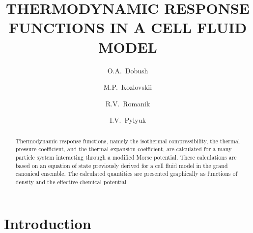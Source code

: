 \documentclass[fleqn,twoside,twocolumn,nofootinbib,showkeys]{revtex4} %
\begin{document}
	\title[Thermodynamic response functions in a cell fluid model]%
	{THERMODYNAMIC RESPONSE FUNCTIONS IN A CELL FLUID MODEL}%
	\author{O.A.~Dobush}%
	\author{M.P.~Kozlovskii}
	\author{R.V.~Romanik}
	\author{I.V.~Pylyuk}
	\address{1, Svientsitskii Str., Lviv 79011, Ukraine}%
	
	 \razd{\secv}
	
	
	\setcounter{page}{1}%
	
	\begin{abstract}
		Thermodynamic response functions, namely the isothermal compressibility, the thermal pressure coefficient, and the thermal expansion coefficient, are calculated for a many-particle system interacting through a modified Morse potential. These calculations are based on an equation of state previously derived for a cell fluid model in the grand canonical ensemble. The calculated quantities are presented graphically as functions of density and the effective chemical potential.
	\end{abstract}
	
	
	\maketitle
	
	\section{Introduction}
	
\end{document}
